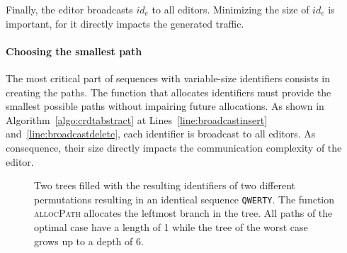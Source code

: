 \noindent Finally, the editor broadcasts $id_{e}$ to all editors. Minimizing the
size of $id_e$ is important, for it directly impacts the generated traffic.

\paragraph{Choosing the smallest path}

The most critical part of sequences with variable-size identifiers consists in
creating the paths. The function that allocates identifiers must provide the
smallest possible paths without impairing future allocations. As shown in
Algorithm~\ref{algo:crdtabstract} at Lines~\ref{line:broadcastinsert}
and~\ref{line:broadcastdelete}, each identifier is broadcast to all editors. As
consequence, their size directly impacts the communication complexity of the
editor.



\begin{figure*}
  \centering
  \hspace{50pt}
  \caption{\label{fig:allocpathexample} Two trees filled with the resulting
    identifiers of two different permutations resulting in an identical sequence
    \texttt{QWERTY}. The function \textsc{allocPath} allocates the leftmost
    branch in the tree. All paths of the optimal case have a length of 1 while
    the tree of the worst case grows up to a depth of 6.}
\end{figure*}

